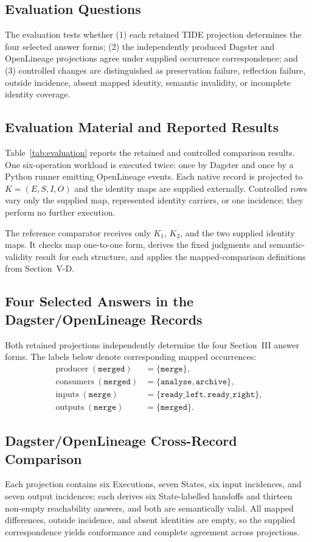 \documentclass[conference]{IEEEtran}
\theoremstyle{tideproposition}
\begin{document}
\subsection{Evaluation Questions}
The evaluation tests whether (1) each retained TIDE projection determines the four selected answer forms; (2) the independently produced Dagster and OpenLineage projections agree under supplied occurrence correspondence; and (3) controlled changes are distinguished as preservation failure, reflection failure, outside incidence, absent mapped identity, semantic invalidity, or incomplete identity coverage.

\subsection{Evaluation Material and Reported Results}
Table~\ref{tab:evaluation} reports the retained and controlled comparison results.
One six-operation workload is executed twice: once by Dagster and once by a Python runner emitting OpenLineage events. Each native record is projected to $K=(E,S,I,O)$ and the identity maps are supplied externally. Controlled rows vary only the supplied map, represented identity carriers, or one incidence; they perform no further execution.

The reference comparator receives only $K_1$, $K_2$, and the two supplied identity maps. It checks map one-to-one form, derives the fixed judgments and semantic-validity result for each structure, and applies the mapped-comparison definitions from Section~V-D.

\subsection{Four Selected Answers in the Dagster/OpenLineage Records}
Both retained projections independently determine the four Section~III answer forms. The labels below denote corresponding mapped occurrences:
\begin{align*}
\operatorname{producer}(\texttt{merged})
   &= \{\texttt{merge}\},\\
\operatorname{consumers}(\texttt{merged})
   &= \{\texttt{analyse},\texttt{archive}\},\\
\operatorname{inputs}(\texttt{merge})
   &= \{\texttt{ready\_left},\texttt{ready\_right}\},\\
\operatorname{outputs}(\texttt{merge})
   &= \{\texttt{merged}\}.
\end{align*}

\subsection{Dagster/OpenLineage Cross-Record Comparison}
Each projection contains six Executions, seven States, six input incidences, and seven output incidences; each derives six State-labelled handoffs and thirteen non-empty reachability answers, and both are semantically valid. All mapped differences, outside incidence, and absent identities are empty, so the supplied correspondence yields conformance and complete agreement across projections.
\end{document}
